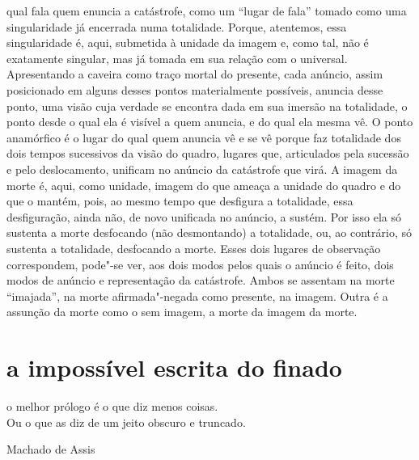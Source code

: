 qual fala quem enuncia a catástrofe, como um ``lugar de fala'' tomado
como uma singularidade já encerrada numa totalidade. Porque, atentemos,
essa singularidade é, aqui, submetida à unidade da imagem e, como tal,
não é exatamente singular, mas já tomada em sua relação com o universal.
Apresentando a caveira como traço mortal do presente, cada anúncio,
assim posicionado em alguns desses pontos materialmente possíveis,
anuncia desse ponto, uma visão cuja verdade se encontra dada em sua
imersão na totalidade, o ponto desde o qual ela é visível a quem
anuncia, e do qual ela mesma vê. O ponto anamórfico é o lugar do qual
quem anuncia vê e se vê porque faz totalidade dos dois tempos sucessivos
da visão do quadro, lugares que, articulados pela sucessão e pelo
deslocamento, unificam no anúncio da catástrofe que virá. A imagem da
morte é, aqui, como unidade, imagem do que ameaça a unidade do quadro e
do que o mantém, pois, ao mesmo tempo que desfigura a totalidade, essa
desfiguração, ainda não, de novo unificada no anúncio, a sustém. Por
isso ela só sustenta a morte desfocando (não desmontando) a totalidade,
ou, ao contrário, só sustenta a totalidade, desfocando a morte. Esses
dois lugares de observação correspondem, pode"-se ver, aos dois modos
pelos quais o anúncio é feito, dois modos de anúncio e representação da
catástrofe. Ambos se assentam na morte ``imajada'', na morte
afirmada"-negada como presente, na imagem. Outra é a assunção da morte
como o sem imagem, a morte da imagem da morte.

\section{a impossível escrita do finado}

\epigraph{o melhor prólogo é o que diz menos coisas.\\
Ou o que as diz de um jeito obscuro e truncado.}{Machado de Assis}


